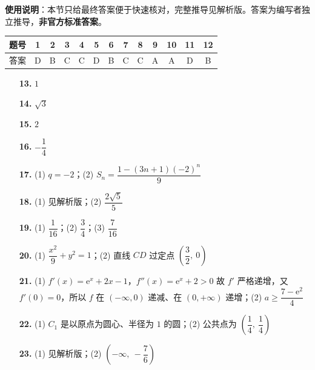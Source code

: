 
\begin{gknotice}
\textbf{使用说明}：本节只给最终答案便于快速核对，完整推导见解析版。答案为编写者独立推导，\textbf{非官方标准答案}。
\end{gknotice}

\begin{center}\begin{tabular}{ccccccccccccc}
\toprule
题号 & 1 & 2 & 3 & 4 & 5 & 6 & 7 & 8 & 9 & 10 & 11 & 12 \\
\midrule
答案 & D & B & C & C & D & B & C & C & A & A & D & B \\
\bottomrule
\end{tabular}\end{center}

\begin{itemize}[leftmargin=2.6em]
  \item[\textbf{13.}] $1$
  \item[\textbf{14.}] $\sqrt3$
  \item[\textbf{15.}] $2$
  \item[\textbf{16.}] $-\dfrac14$
\end{itemize}

\begin{itemize}[leftmargin=2.6em]
  \item[\textbf{17.}] (1) $q=-2$；(2) $S_n=\dfrac{1-(3n+1)(-2)^{n}}9$
  \item[\textbf{18.}] (1) 见解析版；(2) $\dfrac{2\sqrt5}5$
  \item[\textbf{19.}] (1) $\dfrac1{16}$；(2) $\dfrac34$；(3) $\dfrac7{16}$
  \item[\textbf{20.}] (1) $\dfrac{x^{2}}9+y^{2}=1$；(2) 直线 $CD$ 过定点 $\left(\dfrac32,\ 0\right)$
  \item[\textbf{21.}] (1) $f'(x)=\mathrm e^{x}+2x-1$，$f''(x)=\mathrm e^{x}+2>0$ 故 $f'$ 严格递增，又 $f'(0)=0$，所以 $f$ 在 $(-\infty,0)$ 递减、在 $(0,+\infty)$ 递增；(2) $a\ge\dfrac{7-\mathrm e^{2}}4$
\end{itemize}

\begin{itemize}[leftmargin=2.6em]
  \item[\textbf{22.}] (1) $C_1$ 是以原点为圆心、半径为 $1$ 的圆；(2) 公共点为 $\left(\dfrac14,\ \dfrac14\right)$
  \item[\textbf{23.}] (1) 见解析版；(2) $\left(-\infty,\ -\dfrac76\right)$
\end{itemize}
